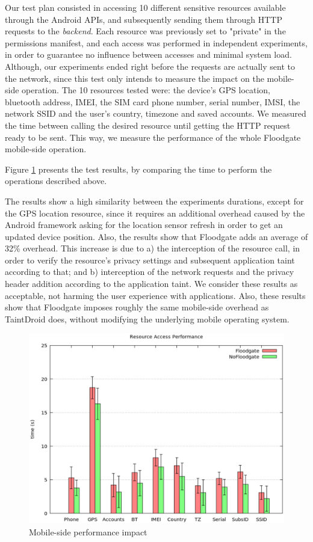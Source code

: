 Our test plan consisted in accessing 10 different sensitive resources available through the Android APIs, and subsequently sending them through HTTP requests to the \textit{backend}. Each resource was previously set to "private" in the permissions manifest, and each access was performed in independent experiments, in order to guarantee no influence between accesses and minimal system load. Although, our experiments ended right before the requests are actually sent to the network, since this test only intends to measure the impact on the mobile-side operation. The 10 resources tested were: the device's GPS location, bluetooth address, IMEI, the SIM card phone number, serial number, IMSI, the network SSID and the user's country, timezone and saved accounts. We measured the time between calling the desired resource until getting the HTTP request ready to be sent. This way, we measure the performance of the whole Floodgate mobile-side operation. 

Figure \ref{fig:mobile-performance} presents the test results, by comparing the time to perform the operations described above.

The results show a high similarity between the experiments durations, except for the GPS location resource, since it requires an additional overhead caused by the Android framework asking for the location sensor refresh in order to get an updated device position. Also, the results show that Floodgate adds an average of 32\% overhead. This increase is due to a) the interception of the resource call, in order to verify the resource's privacy settings and subsequent application taint according to that; and b) interception of the network requests and the privacy header addition according to the application taint. We consider these results as acceptable, not harming the user experience with applications. Also, these results show that Floodgate imposes roughly the same mobile-side overhead as TaintDroid does, without modifying the underlying mobile operating system.

\begin{figure}[t!]
\includegraphics[width=\textwidth]{figs/mobile-performance}
\centering
\caption{Mobile-side performance impact}
\label{fig:mobile-performance}
\end{figure}

